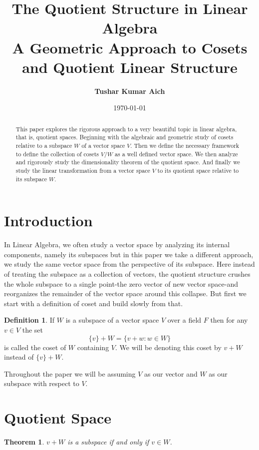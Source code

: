 \documentclass[12pt, a4paper]{article}
\title{\textbf{\Large The Quotient Structure in Linear Algebra\\ \large A Geometric Approach to Cosets and Quotient Linear Structure}}
\author{\textbf{Tushar Kumar Aich}}
\date{\today}
\newtheorem{theorem}{Theorem}[section]
\theoremstyle{definition}
\newtheorem{definition}{Definition}[section]
\theoremstyle{remark}
\begin{document}
	\maketitle
	
	\begin{abstract}
		This paper explores the rigorous approach to a very beautiful topic in linear algebra, that is, quotient spaces. Beginning with the algebraic and geometric study of cosets relative to a subspace $W$ of a vector space $V$. Then we define the necessary framework to define the collection of cosets $V/W$ as a well defined vector space. We then analyze and rigorously study the dimensionality theorem of the quotient space. And finally we study the linear transformation from a vector space $V$ to its quotient space relative to its subspace $W$.
	\end{abstract}
	
	\section{Introduction}
	In Linear Algebra, we often study a vector space by analyzing its internal components, namely its subspaces but in this paper we take a different approach, we study the same vector space from the perspective of its subspace. Here instead of treating the subspace as a collection of vectors, the quotient structure crushes the whole subspace to a single point-the zero vector of new vector space-and reorganizes the remainder of the vector space around this collapse. But first we start with a definition of coset and build slowly from that.
	
	\begin{definition}
		If $W$ is a subspace of a vector space $V$ over a field $F$ then for any $v \in V$ the set 
		\[
		\{v\}+W = \{v+w : w \in W\}
		\]
		is called the coset of $W$ containing $V$. We will be denoting this coset by $v+W$ instead of $\{v\}+W$.
	\end{definition}
	
	Throughout the paper we will be assuming $V$ as our vector and $W$ as our subspace with respect to $V$.
	
	\section{Quotient Space}
	\begin{theorem}
		$v+W$ is a subspace if and only if $v \in W$.
	\end{theorem}
	
\end{document}
